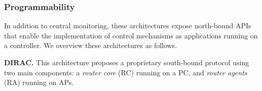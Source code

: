 





\subsubsection{\textbf{Programmability}}
In addition to central monitoring, these architectures expose north-bound APIs that enable the implementation of control mechanisms as applications running on a controller.
We overview these architectures as follows.


\textbf{DIRAC.}
This architecture \cite{DIRAC} proposes a proprietary south-bound protocol using two main components: a \textit{router core} (RC) running on a PC, and \textit{router agents} (RA) running on APs.


